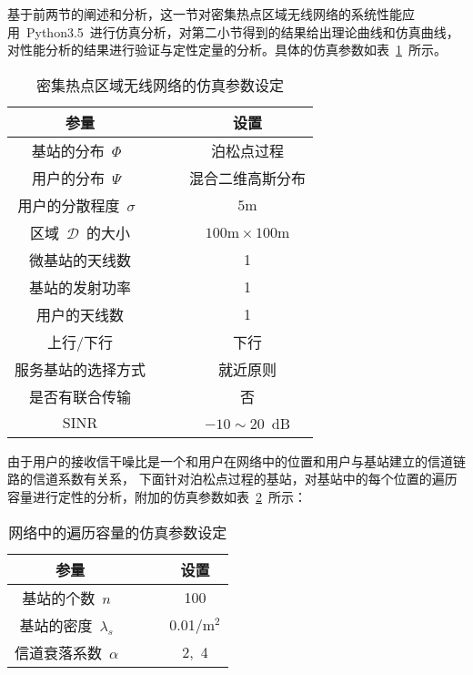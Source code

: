 基于前两节的阐述和分析，这一节对密集热点区域无线网络的系统性能应用~Python3.5~进行仿真分析，对第二小节得到的结果给出理论曲线和仿真曲线，
对性能分析的结果进行验证与定性定量的分析。具体的仿真参数如表~\ref{pc_sim_para}~所示。
\begin{table}[htbp]
\caption{密集热点区域无线网络的仿真参数设定}
\label{pc_sim_para}
\vspace{0.5em}\centering\wuhao
\begin{tabular}{cccc}
\toprule[1.5pt]
参量 & & & 设置 \\
\midrule[0.5pt]
基站的分布~$\Phi$~ & & & 泊松点过程 \\
用户的分布~$\Psi$~  & & & 混合二维高斯分布\\
用户的分散程度~$\sigma$~ & & &  ~$5\mathrm{m}$~ \\
区域~$\mathcal{D}$~的大小  & & & ~$100\mathrm{m} \times 100 \mathrm{m}$~ \\
微基站的天线数 & & & 1 \\
基站的发射功率 & & & 1 \\
用户的天线数 & & & 1 \\
上行/下行 & & & 下行 \\
服务基站的选择方式 & & & 就近原则 \\
是否有联合传输 & & & 否\\
$\mathrm{SINR}$ & & & $-10 \sim 20$~dB \\
\bottomrule[1.5pt]
\end{tabular}
\end{table}
由于用户的接收信干噪比是一个和用户在网络中的位置和用户与基站建立的信道链路的信道系数有关系，
下面针对泊松点过程的基站，对基站中的每个位置的遍历容量进行定性的分析，附加的仿真参数如表~\ref{sinr_sim_para}~所示：
\begin{table}[htbp]
\caption{网络中的遍历容量的仿真参数设定}
\label{sinr_sim_para}
\vspace{0.5em}\centering\wuhao
\begin{tabular}{cccc}
\toprule[1.5pt]
参量 & & & 设置 \\
\midrule[0.5pt]
基站的个数~$n$~ & & &  100\\
基站的密度~$\lambda_s$~ & & &  0.01/${\mathrm{m}^2}$\\
信道衰落系数~$\alpha$~  & & & 2,~4\\
\bottomrule[1.5pt]
\end{tabular}
\end{table}

